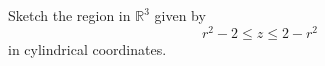 \begin{problem}
Sketch the region in $\mathbb{R}^3$ given by
\[
r^2-2\leq z\leq 2-r^2
\]
in cylindrical coordinates.

\end{problem}